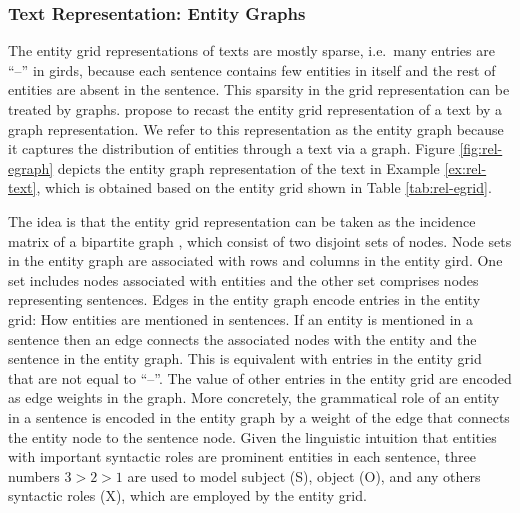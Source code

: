 \subsubsection{Text Representation: Entity Graphs}

The entity grid representations of texts are mostly sparse, i.e.\ many entries are ``--'' in girds,  because each sentence contains few entities in itself and the rest of entities are absent in the sentence. 
This sparsity in the grid representation can be treated by graphs. 
 propose to recast the entity grid representation of a text by a graph representation. 
We refer to this representation as the entity graph because it captures the distribution of entities through a text via a graph. 
Figure \ref{fig:rel-egraph} depicts the entity graph representation of the text in Example \ref{ex:rel-text}, which is obtained based on the entity grid shown in Table \ref{tab:rel-egrid}. 

The idea is that the entity grid representation \cite{barzilay08} can be taken as the incidence matrix of a bipartite graph \cite{guinaudeau13}, which consist of two disjoint sets of nodes.  
Node sets in the entity graph are associated with rows and columns in the entity gird. 
One set includes nodes associated with entities and the other set comprises nodes representing sentences.  
Edges in the entity graph encode entries in the entity grid: How entities are mentioned in sentences. 
If an entity is mentioned in a sentence then an edge connects the associated nodes with the entity and the sentence in the entity graph. 
This is equivalent with entries in the entity grid that are not equal to ``--''. 
The value of other entries in the entity grid are encoded as edge weights in the graph. 
More concretely, the grammatical role of an entity in a sentence is encoded in the entity graph by a weight of the edge that connects the entity node to the sentence node. 
Given the linguistic intuition that entities with important syntactic roles are prominent entities in each sentence, three numbers $3>2>1$ are used to model subject (S), object (O), and any others syntactic roles (X), which are employed by the entity grid. 


